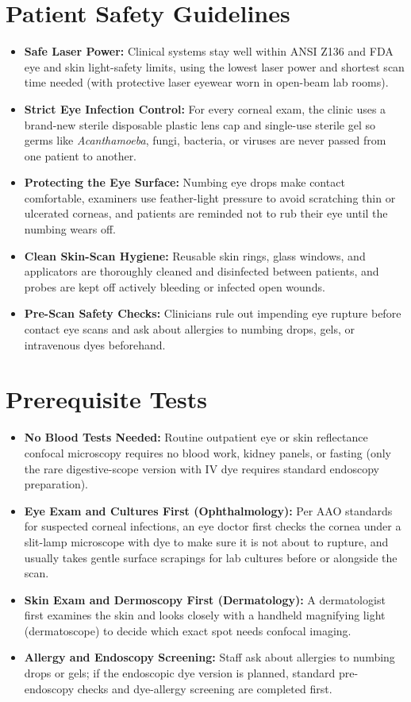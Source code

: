 \section{Patient Safety Guidelines}
\begin{itemize}
    \item \textbf{Safe Laser Power:} Clinical systems stay well within ANSI Z136 and FDA eye and skin light-safety limits, using the lowest laser power and shortest scan time needed (with protective laser eyewear worn in open-beam lab rooms).
    \item \textbf{Strict Eye Infection Control:} For every corneal exam, the clinic uses a brand-new sterile disposable plastic lens cap and single-use sterile gel so germs like \textit{Acanthamoeba}, fungi, bacteria, or viruses are never passed from one patient to another.
    \item \textbf{Protecting the Eye Surface:} Numbing eye drops make contact comfortable, examiners use feather-light pressure to avoid scratching thin or ulcerated corneas, and patients are reminded not to rub their eye until the numbing wears off.
    \item \textbf{Clean Skin-Scan Hygiene:} Reusable skin rings, glass windows, and applicators are thoroughly cleaned and disinfected between patients, and probes are kept off actively bleeding or infected open wounds.
    \item \textbf{Pre-Scan Safety Checks:} Clinicians rule out impending eye rupture before contact eye scans and ask about allergies to numbing drops, gels, or intravenous dyes beforehand.
\end{itemize}

\section{Prerequisite Tests}
\begin{itemize}
    \item \textbf{No Blood Tests Needed:} Routine outpatient eye or skin reflectance confocal microscopy requires no blood work, kidney panels, or fasting (only the rare digestive-scope version with IV dye requires standard endoscopy preparation).
    \item \textbf{Eye Exam and Cultures First (Ophthalmology):} Per AAO standards for suspected corneal infections, an eye doctor first checks the cornea under a slit-lamp microscope with dye to make sure it is not about to rupture, and usually takes gentle surface scrapings for lab cultures before or alongside the scan.
    \item \textbf{Skin Exam and Dermoscopy First (Dermatology):} A dermatologist first examines the skin and looks closely with a handheld magnifying light (dermatoscope) to decide which exact spot needs confocal imaging.
    \item \textbf{Allergy and Endoscopy Screening:} Staff ask about allergies to numbing drops or gels; if the endoscopic dye version is planned, standard pre-endoscopy checks and dye-allergy screening are completed first.
\end{itemize}

